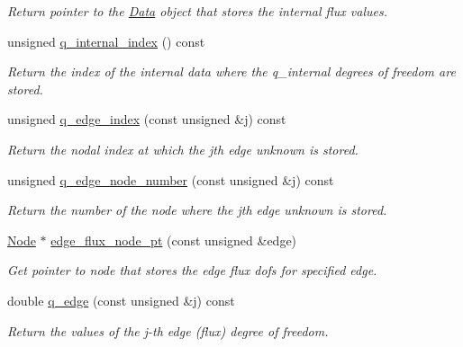 \begin{DoxyCompactItemize}
\begin{DoxyCompactList}\small\item\em Return pointer to the \hyperlink{classoomph_1_1Data}{Data} object that stores the internal flux values. \end{DoxyCompactList}\item 
unsigned \hyperlink{classoomph_1_1TAxisymmetricPoroelasticityElement_a53999a350be9bf4320a19750dd85e71b}{q\+\_\+internal\+\_\+index} () const
\begin{DoxyCompactList}\small\item\em Return the index of the internal data where the q\+\_\+internal degrees of freedom are stored. \end{DoxyCompactList}\item 
unsigned \hyperlink{classoomph_1_1TAxisymmetricPoroelasticityElement_a2b121fc589935b789d63731c5195adb5}{q\+\_\+edge\+\_\+index} (const unsigned \&j) const
\begin{DoxyCompactList}\small\item\em Return the nodal index at which the jth edge unknown is stored. \end{DoxyCompactList}\item 
unsigned \hyperlink{classoomph_1_1TAxisymmetricPoroelasticityElement_a6a76ba9fafcb226230340a6d1d931094}{q\+\_\+edge\+\_\+node\+\_\+number} (const unsigned \&j) const
\begin{DoxyCompactList}\small\item\em Return the number of the node where the jth edge unknown is stored. \end{DoxyCompactList}\item 
\hyperlink{classoomph_1_1Node}{Node} $\ast$ \hyperlink{classoomph_1_1TAxisymmetricPoroelasticityElement_a1dc2c583e30259f5b5729585d074c527}{edge\+\_\+flux\+\_\+node\+\_\+pt} (const unsigned \&edge)
\begin{DoxyCompactList}\small\item\em Get pointer to node that stores the edge flux dofs for specified edge. \end{DoxyCompactList}\item 
double \hyperlink{classoomph_1_1TAxisymmetricPoroelasticityElement_a155b8606a7c2602cc88ec15ae0a19a8f}{q\+\_\+edge} (const unsigned \&j) const
\begin{DoxyCompactList}\small\item\em Return the values of the j-\/th edge (flux) degree of freedom. \end{DoxyCompactList}\item 

\end{DoxyCompactItemize}
